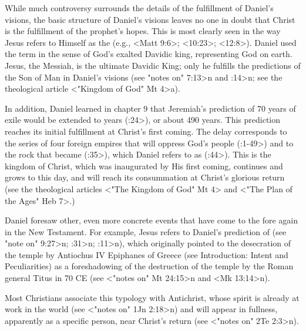 While much controversy surrounds the details of the fulfillment of Daniel's visions, the basic structure of Daniel's visions leaves no one in doubt that Christ is the fulfillment of the prophet's hopes.
This is most clearly seen in the way Jesus refers to Himself as the  (e.g., <Matt 9:6>; <10:23>; <12:8>).
Daniel used the term in the sense of God's exalted Davidic king, representing God on earth.
Jesus, the Messiah, is the ultimate Davidic King; only he fulfills the predictions of the Son of Man in Daniel's visions (see \<"notes on" 7:13>n and :14>n; see the theological article 
<"Kingdom of God" Mt 4>a). 

In addition, Daniel learned in chapter 9 that Jeremiah's prediction of 70 years of exile would be extended 
to  years (:24>), or about 490 years.
This prediction reaches its initial fulfillment at Christ's first coming. The delay corresponds to the series of four foreign empires that will oppress God's people (:1-49>) and to the rock that became  (:35>), which Daniel refers to as  (:44>). 
This is the kingdom of Christ, which was inaugurated by His first coming, continues and grows to this day, and will reach its consummation at Christ's glorious return (see the theological articles <"The Kingdom of God"  Mt 4> and <"The Plan of the Ages"  Heb 7>.)

Daniel foresaw other, even more concrete events that have come to the fore again in the New Testament.
For example, Jesus refers to Daniel's prediction of  (see \<"note on" 9:27>n; :31>n; :11>n),
which originally pointed to the desecration of the temple by Antiochus IV Epiphanes of Greece (see Introduction: Intent and Peculiarities) as a foreshadowing of the destruction of the temple by the Roman general Titus in 70 CE (see <"notes on" Mt 24:15>n and <Mk 13:14>n).

Most Christians associate this typology with Antichrist, whose spirit is already at work in the world (see <"notes on" 1Jn 2:18>n) and will appear in fullness, apparently as a specific person, near Christ's return (see <"notes on" 2Te 2:3>n).


